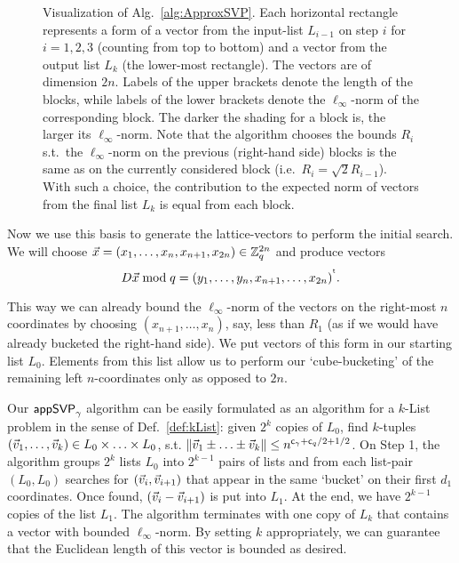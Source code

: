 \begin{figure}[H]
	\caption[$\appSVP$ on a $q$-ary lattice]{ Visualization of Alg.~\ref{alg:ApproxSVP}. Each horizontal rectangle represents a form of a vector from the input-list $L_{i-1}$ on step $i$ for $i=1, 2, 3$ (counting from top to bottom) and a vector from the output list $L_k$ (the lower-most rectangle). The vectors are of dimension $2n$. Labels of the upper brackets denote the length of the blocks, while labels of the lower brackets denote the $\ell_{\infty}$-norm of the corresponding block. The darker the shading for a block is, the larger its $\ell_{\infty}$-norm. Note that the algorithm chooses the bounds $R_i$ s.t.\ the $\ell_{\infty}$-norm on the previous (right-hand side) blocks is the same as on the currently considered block (i.e.\ $R_i = \sqrt{2}R_{i-1}$). With such a choice, the contribution to the expected norm of vectors from the final list $L_k$ is equal from each block.}
	\label{fig:appSVPAlg}
\end{figure}

Now we use this basis to generate the lattice-vectors to perform the initial search. We will choose $\vec x  = (x_1, \ldots, x_n, x_{n+1}, x_{2n}) \in {{\mathbb Z}}_q^{2n}$ and produce vectors
\[
D \vec x \bmod q = (y_1,  \ldots,  y_n,  x_{n+1}, \ldots, x_{2n})^{\mkern0.7mu^{\mathsf{ t}}}.
\]

This way we can already bound the $\ell_{\infty}$-norm of the vectors on the right-most $n$ coordinates by choosing $(x_{n+1}, \ldots, x_n)$, say, less than $R_1$ (as if we would have already bucketed the right-hand side). We put vectors of this form in our starting list $L_0$. Elements from this list allow us to perform our `cube-bucketing' of the remaining left $n$-coordinates only as opposed to $2n$. 

Our $\appSVP$ algorithm can be easily formulated as an algorithm for a $k$-List problem in the sense of Def.~\ref{def:kList}: given $2^k$ copies of $L_0$, find $k$-tuples $(\vvec_1, \ldots, \vvec_k) \in L_0 \times \ldots \times L_0$, s.t. $\| \vvec_1 \pm \ldots \pm \vvec_k \| \leq n^{\cg+\cq/2+1/2}$.  On Step 1, the algorithm groups $2^k$ lists $L_0$ into $2^{k-1}$ pairs of lists and from each list-pair $(L_0, L_0)$ searches for $(\vvec_i, \vvec_{i+1})$ that appear in the same `bucket' on their first $d_1$ coordinates. Once found, $(\vvec_i - \vvec_{i+1})$ is put into $L_1$. At the end, we have $2^{k-1}$ copies of the list $L_1$. The algorithm terminates with one copy of $L_k$ that contains a vector with bounded $\ell_\infty$-norm. By setting $k$ appropriately, we can guarantee that the Euclidean length of this vector is bounded as desired.

